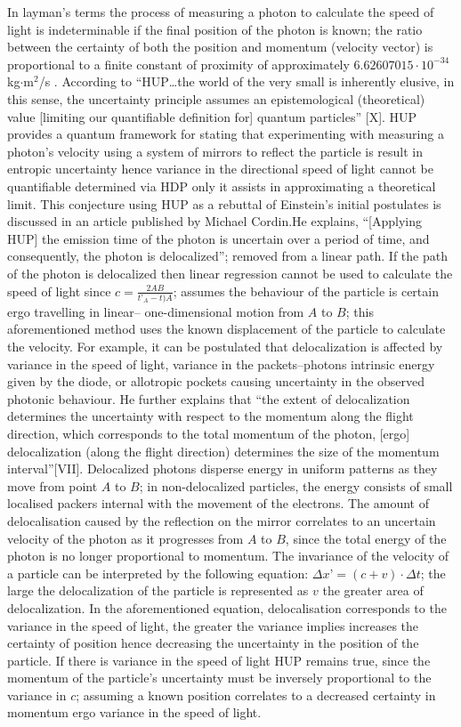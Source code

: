 \documentclass[12pt,letterpaper]{article}
\begin{document}
In layman's terms the process of measuring a photon to calculate the speed of light is indeterminable if the final position of the photon is known; the ratio between the certainty of both the position and momentum (velocity vector) is proportional to a finite constant of proximity of approximately $6.62607015 \cdot 10^{-34}$ kg$\cdot$m$^2$/s . According to “HUP…the world of the very small is inherently elusive, in this sense, the uncertainty principle assumes an epistemological (theoretical) value [limiting our quantifiable definition for] quantum particles” [X]. HUP provides a quantum framework for stating that experimenting with measuring a photon's velocity using a system of mirrors to reflect the particle is result in entropic uncertainty hence variance in the directional speed of light cannot be quantifiable determined via HDP only it assists in approximating a theoretical limit. This conjecture using HUP as a rebuttal of Einstein's initial postulates is discussed in an article published by Michael Cordin.He explains, “[Applying HUP] the emission time of the photon is uncertain over a period of time, and consequently, the photon is delocalized”; removed from a linear path. If the path of the photon is delocalized then linear regression cannot be used to calculate the speed of light since $c=\frac{2AB}{t’_{A}-t)A}$; assumes the behaviour of the particle is certain ergo travelling in linear– one-dimensional motion from $A$ to $B$; this aforementioned method uses the known displacement of the particle to calculate the velocity. For example, it can be postulated that delocalization is affected by variance in the speed of light, variance in the packets–photons intrinsic energy given by the diode, or allotropic pockets causing uncertainty in the observed photonic behaviour. He further explains that “the extent of delocalization determines the uncertainty with respect to the momentum along the flight direction, which corresponds to the total momentum of the photon, [ergo] delocalization (along the flight direction) determines the size of the momentum interval”[VII]. Delocalized photons disperse energy in uniform patterns as they move from point $A$ to $B$; in non-delocalized particles, the energy consists of small localised packers internal with the movement of the electrons. The amount of delocalisation caused by the reflection on the mirror correlates to an uncertain velocity of the photon as it progresses from $A$ to $B$, since the total energy of the photon is no longer proportional to momentum. The invariance of the velocity of a particle can be interpreted by the following equation: $\Delta x’=(c+v) \cdot \Delta t$; the large the delocalization of the particle is represented as $v$ the greater area of delocalization. In the aforementioned equation, delocalisation corresponds to the variance in the speed of light, the greater the variance implies increases the certainty of position hence decreasing the uncertainty in the position of the particle. If there is variance in the speed of light HUP remains true, since the momentum of the particle's uncertainty must be inversely proportional to the variance in $c$; assuming a known position correlates to a decreased certainty in momentum ergo variance in the speed of light.
\end{document}
